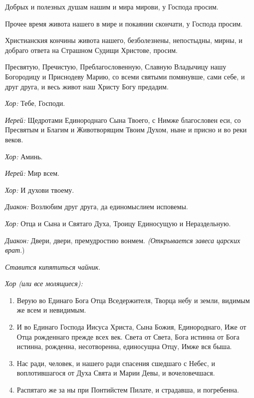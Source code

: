 \begin{mymulticols}
Добрых и полезных душам нашим и мира мирови, у Господа просим. 

Прочее время живота нашего в мире и покаянии скончати, у Господа просим. 

Христианския кончины живота нашего, безболезнены, непостыдны, мирны, и добраго ответа на Страшном Судищи Христове, просим. 

Пресвятую, Пречистую, Преблагословенную, Славную Владычицу нашу Богородицу и Приснодеву Марию, со всеми святыми помянувше, сами себе, и друг друга, и весь живот наш Христу Богу предадим.

{\itshape Хор:} Тебе, Господи.

{\itshape Иерей:} Щедротами Единороднаго Сына Твоего, с Нимже благословен еси, со Пресвятым и Благим и Животворящим Твоим Духом, ныне и присно и во реки веков.

{\itshape Хор:} Аминь.

{\itshape Иерей:} Мир всем.

{\itshape Хор:} И духови твоему.

{\itshape Диакон:} Возлюбим друг друга, да единомыслием исповемы.

{\itshape Хор:} Отца и Сына и Святаго Духа, Троицу Единосущую и Нераздельную.

{\itshape Диакон:} Двери, двери, премудростию вонмем.  {\itshape (Открывается завеса царских врат}.)

{\itshape Ставится кипятиться чайник}. 


{\itshape Хор (или все молящиеся):}

\begin{enumerate}

\item Верую во Единаго Бога Отца Вседержителя, Творца небу и земли, видимым же всем и невидимым. 

\item И во Единаго Господа Иисуса Христа, Сына Божия, Единороднаго, Иже от Отца рожденнаго прежде всех век. Света от Света, Бога истинна от Бога истинна, рожденна, несотворенна, единосущна Отцу, Имже вся быша.

\item Нас ради, человек, и нашего ради спасения сшедшаго с Небес, и воплотившагося от Духа Свята и Марии Девы, и вочеловечшася.

\item Распятаго же за ны при Понтийстем Пилате, и страдавша, и погребенна.


\end{enumerate}
\end{mymulticols}
